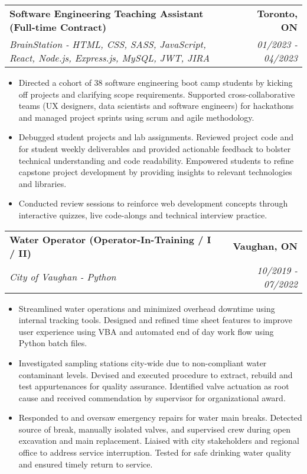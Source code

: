 \documentclass[letterpaper,11pt]{article}
\makeatletter
\newcommand{\resumeItem}[1]{
  \item\small{
    {#1 \vspace{-3pt}}
  }
}
\newcommand{\resumeSubheading}[4]{
  \vspace{-3pt}\item
    \begin{tabular*}{1.0\textwidth}[t]{l@{\extracolsep{\fill}}r}
      \textbf{#1} & \textbf{\small #2} \\
      \textit{\small#3} & \textit{\small #4} \\
    \end{tabular*}\vspace{-7pt}
}
\newcommand{\resumeItemListStart}{\begin{itemize}}
\newcommand{\resumeItemListEnd}{\end{itemize}\vspace{0pt}}
\makeatother
\begin{document}
        \resumeSubheading
        {Software Engineering Teaching Assistant (Full-time Contract)}{Toronto, ON}
            {BrainStation - HTML, CSS, SASS, JavaScript, React, Node.js, Express.js, MySQL, JWT, JIRA}{01/2023 - 04/2023}
            \resumeItemListStart
                \resumeItem{Directed a cohort of 38 software engineering boot camp students by kicking off projects and clarifying scope requirements. Supported cross-collaborative teams (UX designers, data scientists and software engineers) for hackathons and managed project sprints using scrum and agile methodology.}
                \resumeItem{Debugged student projects and lab assignments. Reviewed project code and for student weekly deliverables and provided actionable feedback to bolster technical understanding and code readability. Empowered students to refine capstone project development by providing insights to relevant technologies and libraries.}
                \resumeItem{Conducted review sessions to reinforce web development concepts through interactive quizzes, live code-alongs and technical interview practice.}
            \resumeItemListEnd

        \resumeSubheading
        {Water Operator (Operator-In-Training / I / II)}{Vaughan, ON}
            {City of Vaughan - Python}{10/2019 - 07/2022}
            \resumeItemListStart
                \resumeItem{Streamlined water operations and minimized overhead downtime using internal tracking tools. Designed and refined time sheet features to improve user experience using VBA and automated end of day work flow using Python batch files.}
                \resumeItem{Investigated sampling stations city-wide due to non-compliant water contaminant levels. Devised and executed procedure to extract, rebuild and test appurtenances for quality assurance. Identified valve actuation as root cause and received commendation by supervisor for organizational award.}
                \resumeItem{Responded to and oversaw emergency repairs for water main breaks. Detected source of break, manually isolated valves, and supervised crew during open excavation and main replacement. Liaised with city stakeholders and regional office to address service interruption. Tested for safe drinking water quality and ensured timely return to service.}
            \resumeItemListEnd
\end{document}
